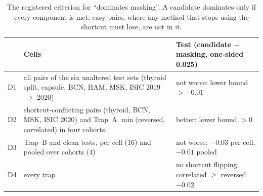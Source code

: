 \begin{table}[H]\centering\scriptsize
\caption{The registered criterion for ``dominates masking''. A candidate dominates only if every component is met; easy pairs, where any method that stops using the shortcut must lose, are not in it.}\label{tab:crit}
\begin{tabular}{lp{9.0cm}p{5.0cm}}\toprule
 & Cells & Test (candidate $-$ masking, one-sided 0.025) \\\midrule
D1 & all pairs of the six unaltered test sets (thyroid split, capsule, BCN, HAM, MSK, ISIC 2019 $\to$ 2020) & not worse: lower bound $>-0.01$ \\
D2 & shortcut-conflicting pairs (thyroid, BCN, MSK, ISIC 2020) and Trap~A $\min$(reversed, correlated) in four cohorts & better: lower bound $>0$ \\
D3 & Trap~B and clean tests, per cell (16) and pooled over cohorts (4) & not worse: $-0.03$ per cell, $-0.01$ pooled \\
D4 & every trap & no shortcut flipping: correlated $\ge$ reversed $-0.02$ \\
\bottomrule\end{tabular}
\end{table}
